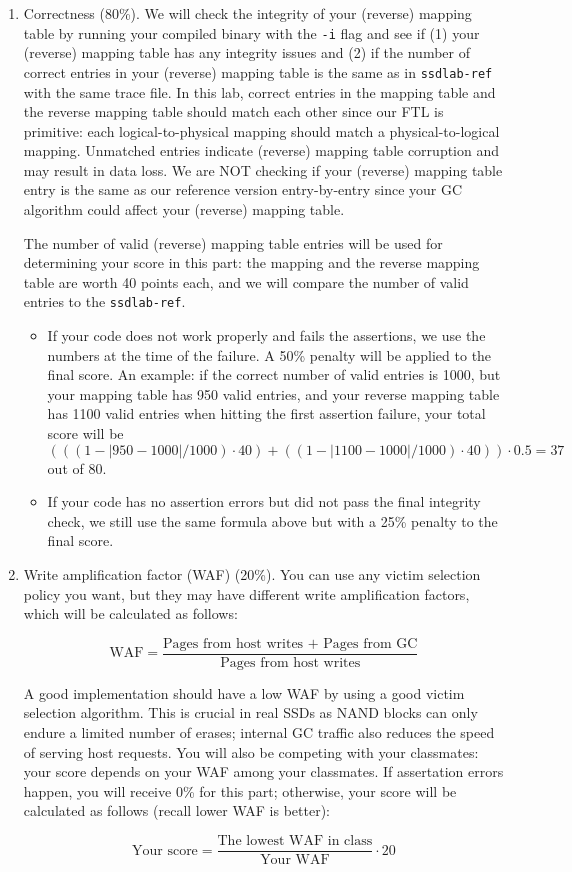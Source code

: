 \documentclass[11pt]{article}
\begin{document}
\begin{enumerate}
    \item Correctness (80\%).
    We will check the integrity of your (reverse) mapping table by running your compiled binary with the \texttt{-i} flag and see if (1) your (reverse) mapping table has any integrity issues and (2) if the number of correct entries in your (reverse) mapping table is the same as in \texttt{ssdlab-ref} with the same trace file. In this lab, correct entries in the mapping table and the reverse mapping table should match each other since our FTL is primitive: each logical-to-physical mapping should match a physical-to-logical mapping. Unmatched entries indicate (reverse) mapping table corruption and may result in data loss. We are NOT checking if your (reverse) mapping table entry is the same as our reference version entry-by-entry since your GC algorithm could affect your (reverse) mapping table.
    
    The number of valid (reverse) mapping table entries will be used for determining your score in this part: the mapping and the reverse mapping table are worth 40 points each, and we will compare the number of valid entries to the \texttt{ssdlab-ref}. 
    \begin{itemize}
        \item If your code does not work properly and fails the assertions, we use the numbers at the time of the failure. A 50\% penalty will be applied to the final score. An example: if the correct number of valid entries is 1000, but your mapping table has 950 valid entries, and your reverse mapping table has 1100 valid entries when hitting the first assertion failure, your total score will be $(((1 - |950-1000|/1000) \cdot 40) + ((1 - |1100-1000|/1000) \cdot 40)) \cdot 0.5 = 37$ out of 80.
        \item If your code has no assertion errors but did not pass the final integrity check, we still use the same formula above but with a 25\% penalty to the final score.
    \end{itemize}
      
    
    \item Write amplification factor (WAF) (20\%). You can use any victim selection policy you want, 
    but they may have different write amplification factors, which will be calculated as follows:

    $$\text{WAF}=\frac{\text{Pages from host writes + Pages from GC}}{\text{Pages from host writes}}$$
    
    A good implementation should have a low WAF by using a good victim selection algorithm.
    This is crucial in real SSDs as NAND blocks can only endure a limited number of erases; internal GC traffic also reduces the speed of serving host requests.
    You will also be competing with your classmates: your score depends on your WAF among your classmates. 
    If assertation errors happen, you will receive 0\% for this part; otherwise, your score will be calculated as follows (recall lower WAF is better):
    
    $$\text{Your score} = \frac{\text{The lowest WAF in class}}{\text{Your WAF}} \cdot 20$$
\end{enumerate}
\end{document}
